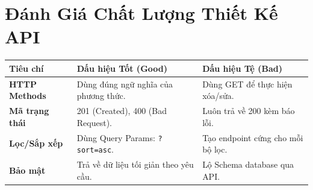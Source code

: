 \documentclass[12pt, a4paper]{article}
\begin{document}
\section{Đánh Giá Chất Lượng Thiết Kế API}
\begin{table}[h]
\centering
\small
\begin{tabularx}{\textwidth}{|l|X|X|}
\hline
\textbf{Tiêu chí} & \textbf{Dấu hiệu Tốt (Good)} & \textbf{Dấu hiệu Tệ (Bad)} \\ \hline
\textbf{HTTP Methods} & Dùng đúng ngữ nghĩa của phương thức. & Dùng GET để thực hiện xóa/sửa. \\ \hline
\textbf{Mã trạng thái} & 201 (Created), 400 (Bad Request). & Luôn trả về 200 kèm báo lỗi. \\ \hline
\textbf{Lọc/Sắp xếp} & Dùng Query Params: \texttt{?sort=asc}. & Tạo endpoint cứng cho mỗi bộ lọc. \\ \hline
\textbf{Bảo mật} & Trả về dữ liệu tối giản theo yêu cầu. & Lộ Schema database qua API. \\ \hline
\end{tabularx}
\end{table}
\end{document}
